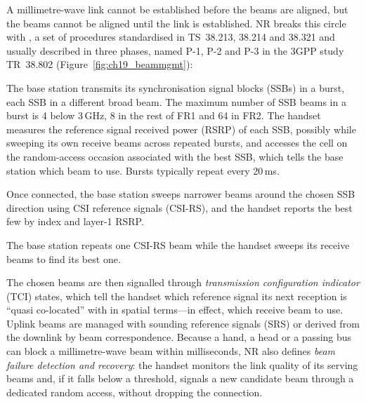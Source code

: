 A millimetre-wave link cannot be established before the beams are aligned, but the beams cannot be
aligned until the link is established. NR breaks this circle with , a set of
procedures standardised in TS~38.213, 38.214 and 38.321 and usually described in three phases,
named P-1, P-2 and P-3 in the 3GPP study TR~38.802 (Figure~\ref{fig:ch19_beammgmt}):
\begin{description}[style=nextline,leftmargin=1.2em,font=\sffamily\bfseries\small\color{navy}]
\item[P-1: initial beam sweep.] The base station transmits its synchronisation signal blocks
(SSBs) in a burst, each SSB in a different broad beam. The maximum number of SSB beams in a burst
is 4 below 3\,GHz, 8 in the rest of FR1 and 64 in FR2. The handset measures the reference signal
received power (RSRP) of each SSB, possibly while sweeping its own receive beams across repeated
bursts, and accesses the cell on the random-access occasion associated with the best SSB, which
tells the base station which beam to use. Bursts typically repeat every 20\,ms.
\item[P-2: transmit beam refinement.] Once connected, the base station sweeps narrower beams around
the chosen SSB direction using CSI reference signals (CSI-RS), and the handset reports the best
few by index and layer-1 RSRP.
\item[P-3: receive beam refinement.] The base station repeats one CSI-RS beam while the handset
sweeps its receive beams to find its best one.
\end{description}

The chosen beams are then signalled through \emph{transmission configuration indicator} (TCI)
states, which tell the handset which reference signal its next reception is ``quasi co-located''
with in spatial terms---in effect, which receive beam to use. Uplink beams are managed with
sounding reference signals (SRS) or derived from the downlink by beam correspondence. Because a
hand, a head or a passing bus can block a millimetre-wave beam within milliseconds, NR also defines
\emph{beam failure detection and recovery}: the handset monitors the link quality of its serving
beams and, if it falls below a threshold, signals a new candidate beam through a dedicated random
access, without dropping the connection.



